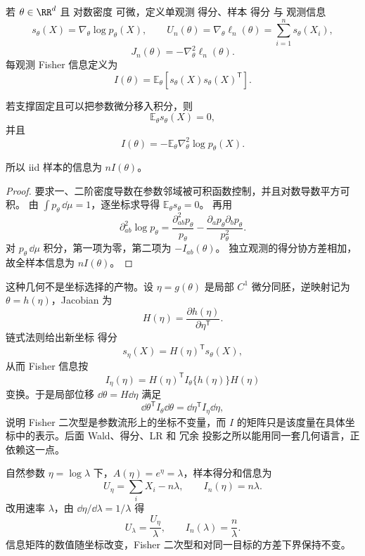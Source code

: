 \begin{definition}
若 $\theta\in\RR^d$ 且 对数密度 可微，定义单观测 得分、样本 得分 与 观测信息
\[
 s_\theta(X)=\nabla_\theta\log p_\theta(X),
 \qquad
 U_n(\theta)=\nabla_\theta\ell_n(\theta)
 =\sum_{i=1}^ns_\theta(X_i),
\]
\[
 J_n(\theta)=-\nabla_\theta^2\ell_n(\theta).
\]
每观测 Fisher 信息定义为
\begin{equation*}I(\theta)
 =\mathbb E_\theta[s_\theta(X)s_\theta(X)^{\mathsf T}].
\end{equation*}
\end{definition}

\begin{proposition}[信息恒等式]
若支撑固定且可以把参数微分移入积分，则
\[
 \mathbb E_\theta s_\theta(X)=0,
\]
并且
\[
 I(\theta)
 =-\mathbb E_\theta\nabla_\theta^2\log p_\theta(X).
\]

所以 iid 样本的信息为 $nI(\theta)$。
\end{proposition}
\begin{proof}
要求一、二阶密度导数在参数邻域被可积函数控制，并且对数导数平方可积。
由 $\int p_\theta\,\dd\mu=1$，逐坐标求导得 $\mathbb E_\theta s_\theta=0$。
再用
\[
 \partial_{ab}^2\log p_\theta
 =\frac{\partial_{ab}^2p_\theta}{p_\theta}
 -\frac{\partial_ap_\theta\partial_bp_\theta}{p_\theta^2}.
\]
对 $p_\theta\,\dd\mu$ 积分，第一项为零，第二项为 $-I_{ab}(\theta)$。
独立观测的得分协方差相加，故全样本信息为 $nI(\theta)$。
\end{proof}


\begin{proposition}
这种几何不是坐标选择的产物。设 $\eta=g(\theta)$ 是局部 $C^1$ 微分同胚，逆映射记为 $\theta=h(\eta)$，Jacobian 为
\[
 H(\eta)=\frac{\partial h(\eta)}{\partial\eta^{\mathsf T}}.
\]
链式法则给出新坐标 得分
\[
 s_\eta(X)
 =H(\eta)^{\mathsf T}s_\theta(X),
\]
从而 Fisher 信息按
\begin{equation}\label{eq:math-stat-fisher-reparameterization}
 I_\eta(\eta)
 =H(\eta)^{\mathsf T}I_\theta\{h(\eta)\}H(\eta)
\end{equation}
变换。于是局部位移 $\dd\theta=H\dd\eta$ 满足
\[
 \dd\theta^{\mathsf T}I_\theta\dd\theta
 =\dd\eta^{\mathsf T}I_\eta\dd\eta,
\]
说明 Fisher 二次型是参数流形上的坐标不变量，而 $I$ 的矩阵只是该度量在具体坐标中的表示。后面 Wald、得分、LR 和 冗余 投影之所以能用同一套几何语言，正依赖这一点。
\end{proposition}


\begin{workedexample}
自然参数 $\eta=\log\lambda$ 下，$A(\eta)=e^\eta=\lambda$，样本得分和信息为
\[
 U_\eta=\sum_iX_i-n\lambda,\qquad I_n(\eta)=n\lambda.
\]
改用速率 $\lambda$，由 $\dd\eta/\dd\lambda=1/\lambda$ 得
\[
 U_\lambda=\frac{U_\eta}{\lambda},\qquad I_n(\lambda)=\frac n\lambda.
\]
信息矩阵的数值随坐标改变，Fisher 二次型和对同一目标的方差下界保持不变。
\end{workedexample}

